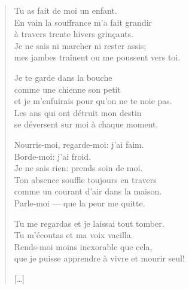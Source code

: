 \documentclass[11pt]{book}
\newcommand*{\centeredornament}{\centerline{\pgfornament[width=6cm]{88}}}
\begin{document}
\begin{verse}
  Tu as fait de moi un enfant. \\
  En vain la souffrance m'a fait grandir \\
  à travers trente hivers grinçants. \\
  Je ne sais ni marcher ni rester assis; \\
  mes jambes traînent ou me poussent vers toi.

  Je te garde dans la bouche \\
  comme une chienne son petit \\
  et je m'enfuirais pour qu'on ne te noie pas. \\
  Les ans qui ont détruit mon destin \\
  se déversent sur moi à chaque moment.

  Nourris-moi, regarde-moi: j'ai faim. \\
  Borde-moi: j'ai froid. \\
  Je ne sais rien: prends soin de moi. \\
  Ton absence souffle toujours en travers \\
  comme un courant d'air dans la maison. \\
  Parle-moi --- que la peur me quitte.

  Tu me regardas et je laissai tout tomber. \\
  Tu m'écoutas et ma voix vacilla. \\
  Rends-moi moins inexorable que cela, \\
  que je puisse apprendre à vivre et mourir seul!\hspace*{-1mm}

  \hfill [\ldots]
\end{verse}

\newpage

\vspace*{-15mm}
\centeredornament


\end{document}
